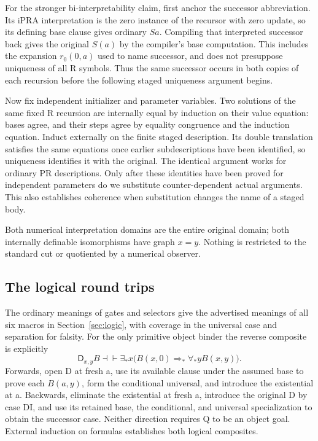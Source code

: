 \documentclass[11pt,letterpaper]{article}
\theoremstyle{definition}\newtheorem{definition}[theorem]{Definition}
\theoremstyle{remark}\newtheorem{remark}[theorem]{Remark}
\newcommand{\D}{\ensuremath{\mathsf D}}
\begin{document}
For the stronger bi-interpretability claim, first anchor the successor
abbreviation. Its iPRA interpretation is the zero instance of the
recursor with zero update, so its defining base clause gives ordinary
$Sa$. Compiling that interpreted successor back gives the original
$S(a)$ by the compiler's base computation. This includes the expansion
$r_0(0,a)$ used to name successor, and does not presuppose uniqueness
of all R symbols. Thus the same successor occurs in both copies of each
recursion before the following staged uniqueness argument begins.

Now fix independent initializer and parameter variables. Two solutions
of the same fixed R recursion
are internally equal by induction on their value equation: bases agree,
and their steps agree by equality congruence and the induction equation.
Induct externally on the finite staged description. Its double
translation satisfies the same equations once earlier subdescriptions
have been identified, so uniqueness identifies it with the original.
The identical argument works for ordinary PR descriptions. Only after
these identities have been proved for independent parameters do we
substitute counter-dependent actual arguments. This also establishes
coherence when substitution changes the name of a staged body.

Both numerical interpretation domains are the entire original domain;
both internally definable isomorphisms have graph $x=y$. Nothing is
restricted to the standard cut or quotiented by a numerical observer.

\subsection{The logical round trips}

The ordinary meanings of gates and selectors give the advertised
meanings of all six macros in Section~\ref{sec:logic}, with coverage
in the universal case and separation for falsity. For the only primitive
object binder the reverse composite is explicitly
\[
 \D_{x,y}B\dashv\vdash
 \exists_*x\bigl(B(x,0)\Rightarrow_*\forall_*yB(x,y)\bigr).
\]
Forwards, open D at fresh a, use its available clause under the assumed
base to prove each $B(a,y)$, form the conditional universal, and introduce
the existential at a. Backwards, eliminate the existential at fresh a,
introduce the original D by case DI, and use its retained base, the
conditional, and universal specialization to obtain the successor case.
Neither direction requires Q to be an object goal. External induction
on formulas establishes both logical composites.
\end{document}
